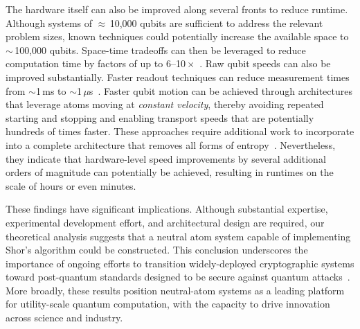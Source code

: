\documentclass[reprint,twocolumn,secnumarabic,amssymb, aps, prx]{revtex4-2}
\begin{document}
The hardware itself can also be improved along several fronts to reduce runtime. Although systems of $\approx$\,10,000 qubits are sufficient to address the relevant problem sizes, known techniques could potentially increase the available space to $\sim$\,100,000 qubits. Space-time tradeoffs can then be leveraged to reduce computation time by factors of up to 6--10\,$\times$~\cite{fowler2012bridge, fowler2012time}. Raw qubit speeds can also be improved substantially. Faster readout techniques can reduce measurement times from $\sim$1\,ms to $\sim$1\,$\mu$s~\cite{falconi2025microsecond}. Faster qubit motion can be achieved through architectures that leverage atoms moving at \textit{constant velocity}, thereby avoiding repeated starting and stopping and enabling transport speeds that are potentially hundreds of times faster. These approaches require additional work to incorporate into a complete architecture that removes all forms of entropy~\cite{bluvstein2025architectural}. Nevertheless, they indicate that hardware-level speed improvements by several additional orders of magnitude can potentially be achieved, resulting in runtimes on the scale of hours or even minutes.

These findings have significant implications. Although substantial expertise, experimental development effort, and architectural design are required, our theoretical analysis suggests that a neutral atom system capable of implementing Shor's algorithm could be constructed. This conclusion underscores the importance of ongoing efforts to transition widely-deployed cryptographic systems toward post-quantum standards designed to be secure against quantum attacks~\cite{FIPS203,FIPS204,FIPS205}. More broadly, these results position neutral-atom systems as a leading platform for utility-scale quantum computation, with the capacity to drive innovation across science and industry. \\

\clearpage
\newpage



\clearpage
\newpage

\setcounter{figure}{0}
\renewcommand{\figurename}{Extended Data Fig.}
\renewcommand{\tablename}{Extended Data Table}
\end{document}
